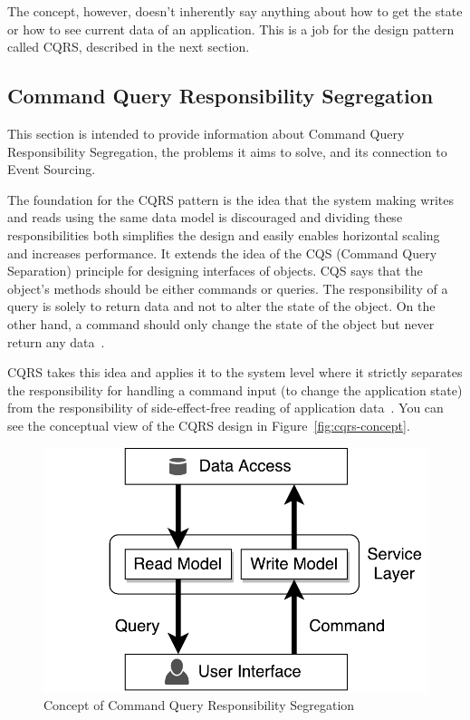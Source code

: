 \documentclass{book}
\begin{document}
The concept, however, doesn't inherently say anything about how to get
the state or how to see current data of an application. This is a job
for the design pattern called CQRS, described in the next section.


\subsection{Command Query Responsibility
Segregation}\label{command-query-responsibility-segregation}

This section is intended to provide information about Command Query
Responsibility Segregation, the problems it aims to solve, and its
connection to Event Sourcing.

The foundation for the CQRS pattern is the idea that the system making
writes and reads using the same data model is discouraged and dividing
these responsibilities both simplifies the design and easily enables
horizontal scaling and increases performance. It extends the idea of the
CQS (Command Query Separation) principle for designing interfaces of
objects. CQS says that the object's methods should be either commands or
queries. The responsibility of a query is solely to return data and not
to alter the state of the object. On the other hand, a command should
only change the state of the object but never return any data~\cite{journey}.

CQRS takes this idea and applies it to the system level where it
strictly separates the responsibility for handling a command input (to
change the application state) from the responsibility of
side-effect-free reading of application data~\cite{journey}. You can see
the conceptual view of the CQRS design in Figure~\ref{fig:cqrs-concept}.


\begin{figure}[h!]
\begin{center}
\includegraphics[width=0.7\columnwidth]{figures/cqrs-concept/cqrs-concept}
\caption{Concept of Command Query Responsibility Segregation%
}
\end{center}
\end{figure}
\end{document}

